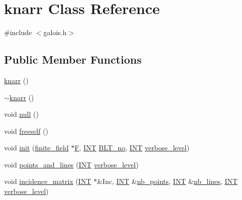\hypertarget{classknarr}{}\section{knarr Class Reference}
\label{classknarr}


{\ttfamily \#include $<$galois.\+h$>$}

\subsection*{Public Member Functions}
\begin{DoxyCompactItemize}
\item 
\mbox{\hyperlink{classknarr_a4f7f0096a6b462a94c0e18ba5be2dd3d}{knarr}} ()
\item 
\mbox{\hyperlink{classknarr_acebb53313c4bb70730d23783fba7c4ce}{$\sim$knarr}} ()
\item 
void \mbox{\hyperlink{classknarr_a0404c8ec7f109c15730d2c61f2cfe4d8}{null}} ()
\item 
void \mbox{\hyperlink{classknarr_abd2281ac20def4284aa8431ba773e82c}{freeself}} ()
\item 
void \mbox{\hyperlink{classknarr_a1e25f28aeec8f316cc0ce81eb89e670e}{init}} (\mbox{\hyperlink{classfinite__field}{finite\+\_\+field}} $\ast$\mbox{\hyperlink{classknarr_aa0e365d405ed5af05b49ffa9c1b7a842}{F}}, \mbox{\hyperlink{galois_8h_a09fddde158a3a20bd2dcadb609de11dc}{I\+NT}} \mbox{\hyperlink{classknarr_ad174ea563e958850b28f80ee997ba359}{B\+L\+T\+\_\+no}}, \mbox{\hyperlink{galois_8h_a09fddde158a3a20bd2dcadb609de11dc}{I\+NT}} \mbox{\hyperlink{simeon_8_c_a818073fbcc2f439e7c56952f67386122}{verbose\+\_\+level}})
\item 
void \mbox{\hyperlink{classknarr_abb50a19df35495d508b0cb127d4eb908}{points\+\_\+and\+\_\+lines}} (\mbox{\hyperlink{galois_8h_a09fddde158a3a20bd2dcadb609de11dc}{I\+NT}} \mbox{\hyperlink{simeon_8_c_a818073fbcc2f439e7c56952f67386122}{verbose\+\_\+level}})
\item 
void \mbox{\hyperlink{classknarr_a17190785c3e2f76bb588be12ccd3e5f9}{incidence\+\_\+matrix}} (\mbox{\hyperlink{galois_8h_a09fddde158a3a20bd2dcadb609de11dc}{I\+NT}} $\ast$\&Inc, \mbox{\hyperlink{galois_8h_a09fddde158a3a20bd2dcadb609de11dc}{I\+NT}} \&\mbox{\hyperlink{hamming_8_c_ad8ae9bd69df4346f4f3130a6ae6d036b}{nb\+\_\+points}}, \mbox{\hyperlink{galois_8h_a09fddde158a3a20bd2dcadb609de11dc}{I\+NT}} \&\mbox{\hyperlink{hamming_8_c_ac0679276a2483f153f00d12bd590f382}{nb\+\_\+lines}}, \mbox{\hyperlink{galois_8h_a09fddde158a3a20bd2dcadb609de11dc}{I\+NT}} \mbox{\hyperlink{simeon_8_c_a818073fbcc2f439e7c56952f67386122}{verbose\+\_\+level}})
\end{DoxyCompactItemize}
